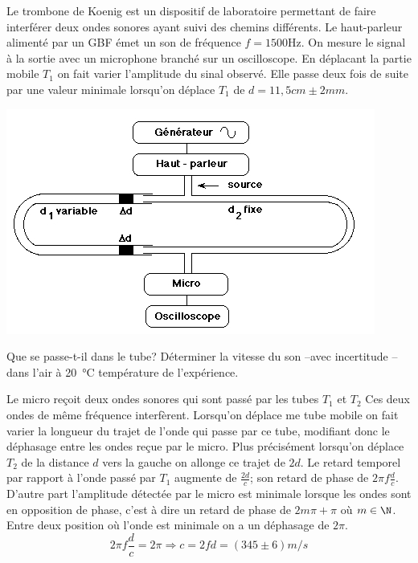\begin{Exercise}[title=Mesure de la vitesse du son ]
	Le trombone de Koenig est un dispositif de laboratoire permettant de faire interférer deux ondes sonores ayant suivi des chemins différents.
	Le haut-parleur alimenté par un GBF émet un son de fréquence $f=1500$Hz.
	On mesure le signal à la sortie avec un microphone branché sur un oscilloscope. En déplacant la partie mobile $T_1$ on fait varier l'amplitude du sinal observé.
	Elle passe deux fois de suite par une valeur minimale lorsqu'on déplace $T_1$ de $d=11,5cm \pm 2mm$.
	\begin{center}
		\includegraphics[scale=0.4]{./fig/koenig.jpg}
	\end{center}
	\Question Que se passe-t-il dans le tube?
	\Question Déterminer la vitesse du son --avec incertitude -- dans l'air à \SI{20}{\celsius} température de l'expérience.
\end{Exercise}
\begin{Answer}
	Le micro reçoit deux ondes sonores qui sont passé par les tubes $T_1$ et $T_2$ Ces deux ondes de même fréquence interfèrent.
	Lorsqu'on déplace me tube mobile on fait varier la longueur du trajet de l'onde qui passe par ce tube, modifiant donc le déphasage entre les ondes reçue par le micro.
	Plus précisément lorsqu'on déplace $T_2$ de la distance $d$ vers la gauche on allonge ce trajet de $2d$.
	Le retard temporel par rapport à l'onde passé par $T_1$ augmente de $\frac{2d}{c}$; son retard de phase de $2\pi f \frac{d}{c}$.
	D'autre part l'amplitude détectée par le micro est minimale lorsque les ondes sont en opposition de phase, c'est à dire un retard de phase de $2m\pi + \pi$ où $m \in \N$.
	Entre deux position où l'onde est minimale on a un déphasage de $2\pi$.
	\[ 2\pi f \frac{d}{c} = 2\pi \Rightarrow c=2fd=(345\pm 6 ) m/s\]
\end{Answer}
